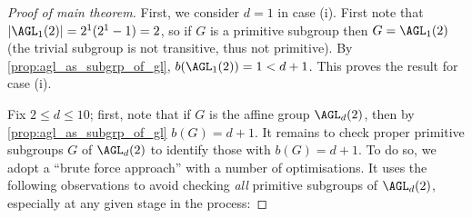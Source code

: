 \begin{proof}[Proof of main theorem]
    First, we consider $d = 1$ in case (i). First note that $|\AGL_1(2)| = 2^1(2^1 - 1) = 2$, so if $G$ is a primitive subgroup then $G = \AGL_1(2)$ (the trivial subgroup is not transitive, thus not primitive). By \autoref{prop:agl_as_subgrp_of_gl}, $b(\AGL_1(2)) = 1 < d + 1$. This proves the result for case (i).

    Fix $2 \leq d \leq 10$; first, note that if $G$ is the affine group $\AGL_d(2)$, then by \autoref{prop:agl_as_subgrp_of_gl} $b(G) = d + 1$. It remains to check proper primitive subgroups $G$ of $\AGL_d(2)$ to identify those with $b(G) = d + 1$. To do so, we adopt a ``brute force approach'' with a number of optimisations. It uses the following observations to avoid checking \textit{all} primitive subgroups of $\AGL_d(2)$, especially at any given stage in the process:


\end{proof}
